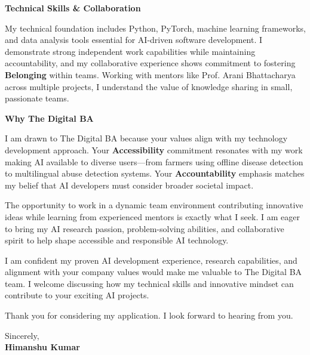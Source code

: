 \documentclass[10pt,a4paper]{article}
\begin{document}
\textbf{Technical Skills \& Collaboration}

My technical foundation includes Python, PyTorch, machine learning frameworks, and data analysis tools essential for AI-driven software development. I demonstrate strong independent work capabilities while maintaining accountability, and my collaborative experience shows commitment to fostering \textbf{Belonging} within teams. Working with mentors like Prof. Arani Bhattacharya across multiple projects, I understand the value of knowledge sharing in small, passionate teams.

\textbf{Why The Digital BA}

I am drawn to The Digital BA because your values align with my technology development approach. Your \textbf{Accessibility} commitment resonates with my work making AI available to diverse users—from farmers using offline disease detection to multilingual abuse detection systems. Your \textbf{Accountability} emphasis matches my belief that AI developers must consider broader societal impact.

The opportunity to work in a dynamic team environment contributing innovative ideas while learning from experienced mentors is exactly what I seek. I am eager to bring my AI research passion, problem-solving abilities, and collaborative spirit to help shape accessible and responsible AI technology.

I am confident my proven AI development experience, research capabilities, and alignment with your company values would make me valuable to The Digital BA team. I welcome discussing how my technical skills and innovative mindset can contribute to your exciting AI projects.

Thank you for considering my application. I look forward to hearing from you.

\vspace{0.3cm}

Sincerely, \\
\textbf{Himanshu Kumar}
\end{document}
